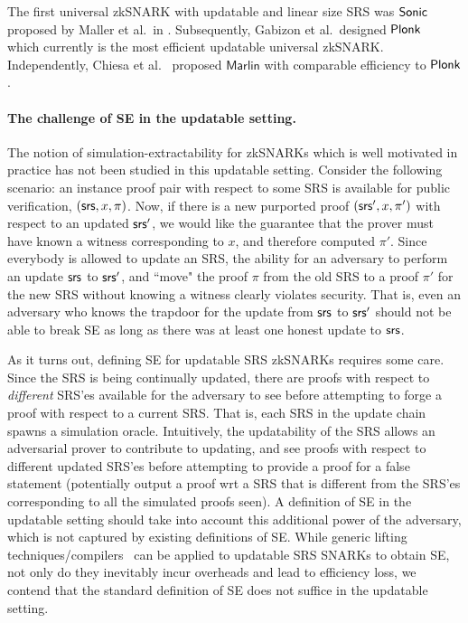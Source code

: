 The first universal zkSNARK with updatable and linear size SRS was
${\textnormal{\textsf{Sonic}}}$ proposed by Maller et al.~in \cite{CCS:MBKM19}. Subsequently, Gabizon et
al.~designed $\textnormal{\textsf{Plonk}}$~\cite{EPRINT:GabWilCio19} which currently is the
most efficient updatable universal zkSNARK. Independently, Chiesa et
al.~\cite{EC:CHMMVW20} proposed $\textsf{Marlin}$ with comparable efficiency to
$\textnormal{\textsf{Plonk}}$.

\paragraph{The challenge of SE in the updatable setting.}

The notion of simulation-extractability for zkSNARKs which is well motivated in practice has not been studied in this updatable setting. 
Consider the following scenario: an instance proof pair with respect to some SRS is available for public verification, $(\mathsf{srs},x,\pi)$. Now, if there is a new purported proof $(\mathsf{srs}',x,\pi')$ with respect to an updated $\mathsf{srs}'$, we would like the guarantee that the prover must have known a witness corresponding to $x$, and therefore computed $\pi'$. Since everybody is allowed to update an SRS, the ability for an adversary to perform an update $\mathsf{srs}$ to $\mathsf{srs}'$, and ``move" the proof $\pi$ from the old SRS to a proof $\pi'$ for the new SRS without knowing a witness clearly violates security. That is, even an adversary who knows the trapdoor for the update from $\mathsf{srs}$ to $\mathsf{srs}'$ should not be able to break SE as long as there was at least one honest update to $\mathsf{srs}$.

As it turns out, defining SE for updatable SRS zkSNARKs requires some care. 
Since the SRS is being continually updated, there are proofs with respect to \textit{different} SRS'es available for the adversary to see before attempting to forge a proof with respect to a current SRS. 
That is, each SRS in the update chain spawns a simulation oracle. Intuitively, the updatability of the SRS allows an adversarial prover to contribute to updating, and see proofs with respect to different updated SRS'es before attempting to provide a proof for a false statement (potentially output a proof wrt a SRS that is different from the SRS'es corresponding to all the simulated proofs seen). A definition of SE in the updatable setting should take into account this additional power of the adversary, which is not captured by existing definitions of SE. 
While generic lifting techniques/compilers~\cite{EPRINT:KZMQCP15,CCS:AbdRamSla20} can be applied to updatable SRS SNARKs to obtain SE, not only do they inevitably incur overheads and lead to efficiency loss, we contend that the standard definition of SE does not suffice in the updatable setting.


